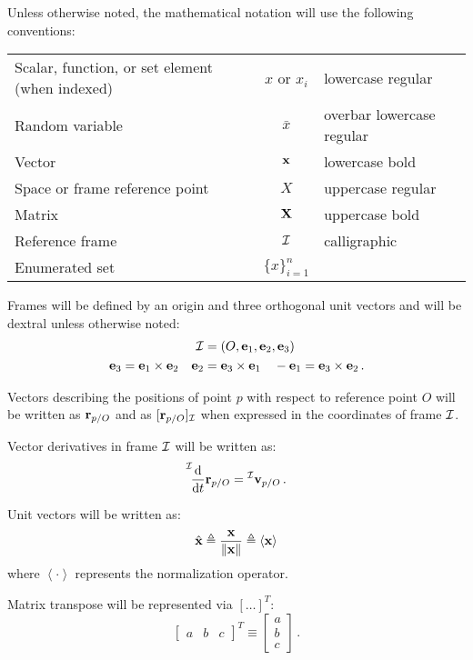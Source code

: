 \noindent Unless otherwise noted, the mathematical notation will use the following conventions:

\begin{tabular}{l c l}
Scalar, function, or set element (when indexed) & $x$ or $x_i$ & lowercase regular\\
Random variable & $\bar x$& overbar lowercase regular\\
Vector & $\mathbf x$ & lowercase bold\\
Space or frame reference point &$X$& uppercase regular \\
Matrix &$\mathbf X$& uppercase bold\\
Reference frame &$\mathcal I$& calligraphic\\
Enumerated set & $\{x\}_{i=1}^{n}$ &
\end{tabular}

\medskip
\noindent Frames will be defined by an origin and three orthogonal unit vectors and will be dextral unless otherwise noted:
\begin{align*}
\mathcal I &= (O,\mathbf e_1, \mathbf e_2, \mathbf e_3)\\
\mathbf e_3 = \mathbf e_1 \times \mathbf e_2 \quad
\mathbf e_2 &= \mathbf e_3 \times \mathbf e_1 \quad
-\mathbf e_1 = \mathbf e_3 \times \mathbf e_2  \, .
\end{align*}

\noindent Vectors describing the positions of point $p$ with respect to reference point $O$ will be written as $\mathbf r_{p/O}$ and as  $[\mathbf r_{p/O}]_{\mathcal I}$ when expressed in the coordinates of frame $\mathcal I$.

\noindent Vector derivatives in frame $\mathcal I$ will be written as:
\begin{equation*}
\fddt{I} \mf  r_{p/O} = {}^\mc I \mf v_{p/O} \,.
\end{equation*}

\noindent Unit vectors will be written as:
\begin{equation*}
\hat{\mathbf  x} \triangleq \frac{\mathbf{x}}{\Vert \mathbf x \Vert} \triangleq \left< \mathbf x \right>
\end{equation*}
where $\left< \cdot \right>$ represents the normalization operator.

\noindent Matrix transpose will be represented via $[\ldots]^T$:
\begin{equation*}
\begin{bmatrix} a & b & c \end{bmatrix}^T \equiv \begin{bmatrix} a\\ b\\c \end{bmatrix} \,.
\end{equation*}

